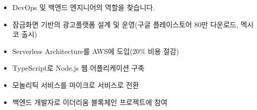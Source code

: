 \documentclass[10pt,a4paper,ragged2e]{altacv}
\begin{document}

\begin{fullwidth}
\makecvheader
\end{fullwidth}



  \begin{itemize}
      \item DevOps 및 백엔드 엔지니어의 역할을 찾습니다.
  \end{itemize}

\begin{itemize}
    \item {잠금화면 기반의 광고플랫폼 설계 및 운영(구글 플레이스토어 80만 다운로드, 멕시코 출시)}
    \smallskip
    \item {Serverless Architecture를 AWS에 도입(20\% 비용 절감)}
    \smallskip
    \item {TypeScript로 Node.js 웹 어플리케이션 구축}
    \smallskip
    \item {모놀리틱 서비스를 마이크로 서비스로 전환}
    \smallskip
    \item {백엔드 개발자로 이더리움 블록체인 프로젝트에 참여}
\end{itemize}
\end{document}
